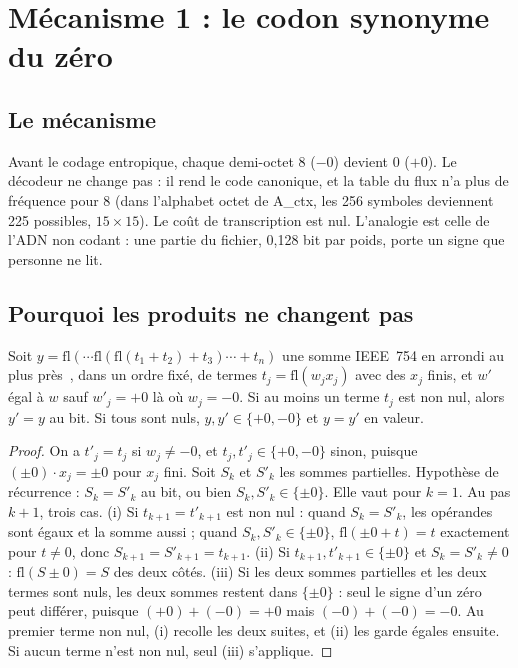 \section{Mécanisme 1 : le codon synonyme du zéro}\label{t3ecl:sec:zero}

\subsection{Le mécanisme}

Avant le codage entropique, chaque demi-octet 8 ($-0$) devient 0 ($+0$). Le décodeur ne change pas : il rend le code canonique, et la table du flux n'a plus de fréquence pour 8 (dans l'alphabet octet de A\_ctx, les 256 symboles deviennent 225 possibles, $15 \times 15$). Le coût de transcription est nul. L'analogie est celle de l'ADN non codant : une partie du fichier, 0,128 bit par poids, porte un signe que personne ne lit.

\subsection{Pourquoi les produits ne changent pas}

\begin{proposition}\label{t3ecl:prop:zero}
Soit $y = \mathrm{fl}(\cdots\mathrm{fl}(\mathrm{fl}(t_1 + t_2) + t_3)\cdots + t_n)$ une somme IEEE~754 en arrondi au plus près~\cite{ieee754}, dans un ordre fixé, de termes $t_j = \mathrm{fl}(w_j x_j)$ avec des $x_j$ finis, et $w'$ égal à $w$ sauf $w'_j = +0$ là où $w_j = -0$. Si au moins un terme $t_j$ est non nul, alors $y' = y$ au bit. Si tous sont nuls, $y, y' \in \{+0, -0\}$ et $y = y'$ en valeur.
\end{proposition}

\begin{proof}
On a $t'_j = t_j$ si $w_j \ne -0$, et $t_j, t'_j \in \{+0, -0\}$ sinon, puisque $(\pm0)\cdot x_j = \pm0$ pour $x_j$ fini. Soit $S_k$ et $S'_k$ les sommes partielles. Hypothèse de récurrence : $S_k = S'_k$ au bit, ou bien $S_k, S'_k \in \{\pm0\}$. Elle vaut pour $k = 1$. Au pas $k+1$, trois cas. (i) Si $t_{k+1} = t'_{k+1}$ est non nul : quand $S_k = S'_k$, les opérandes sont égaux et la somme aussi ; quand $S_k, S'_k \in \{\pm0\}$, $\mathrm{fl}(\pm0 + t) = t$ exactement pour $t \ne 0$, donc $S_{k+1} = S'_{k+1} = t_{k+1}$. (ii) Si $t_{k+1}, t'_{k+1} \in \{\pm0\}$ et $S_k = S'_k \ne 0$ : $\mathrm{fl}(S \pm 0) = S$ des deux côtés. (iii) Si les deux sommes partielles et les deux termes sont nuls, les deux sommes restent dans $\{\pm0\}$ : seul le signe d'un zéro peut différer, puisque $(+0) + (-0) = +0$ mais $(-0) + (-0) = -0$. Au premier terme non nul, (i) recolle les deux suites, et (ii) les garde égales ensuite. Si aucun terme n'est non nul, seul (iii) s'applique.
\end{proof}

